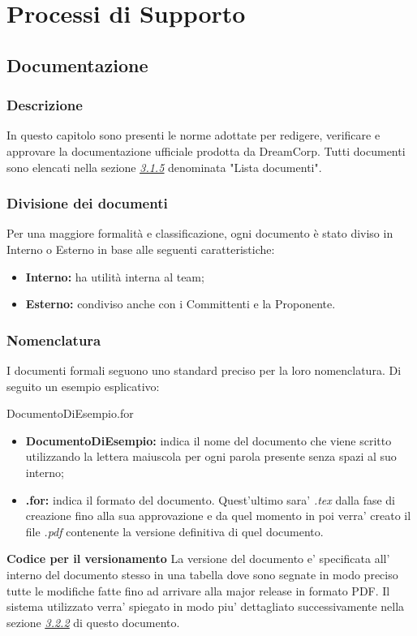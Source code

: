 \section{Processi di Supporto}

	\subsection{Documentazione}
		\subsubsection{Descrizione}
			In questo capitolo sono presenti le norme adottate per 					redigere, verificare e approvare la documentazione 						ufficiale prodotta da DreamCorp. Tutti documenti sono 					elencati nella sezione \hyperref[3.1.5]{\textit{\underline{3.1.5}}} denominata "Lista documenti".
		\subsubsection{Divisione dei documenti}
			Per una maggiore formalità e classificazione, ogni 						documento è stato diviso in Interno o Esterno in base alle 				seguenti caratteristiche:
			\begin{itemize}
				\item \textbf{Interno:} ha utilità interna al team;
				\item \textbf{Esterno:} condiviso anche con i Committenti e la Proponente.
			\end{itemize}
		\subsubsection{Nomenclatura}
			I documenti formali seguono uno standard preciso per la 				loro nomenclatura. Di seguito un esempio esplicativo: 					\newline 
			\begin{center}
				DocumentoDiEsempio.for
			\end{center}
			\begin{itemize}
				\item \textbf{DocumentoDiEsempio:} indica il nome del documento che viene scritto utilizzando la lettera maiuscola per ogni parola presente senza spazi al suo interno;
				\item \textbf{.for:} indica il formato del documento. Quest'ultimo sara' \textit{.tex} dalla fase di creazione fino alla sua approvazione e da quel momento in poi verra' creato il file \textit{.pdf} contenente la versione definitiva di quel documento.
			\end{itemize}
			\textbf{Codice per il versionamento} La versione del documento e' specificata all' interno del documento stesso in una tabella dove sono segnate in modo preciso tutte le modifiche fatte fino ad arrivare alla major release in formato PDF. Il sistema utilizzato verra' spiegato in modo piu' dettagliato successivamente nella sezione \hyperref[3.2.2]{\textit{\underline{3.2.2}}} di questo documento.
